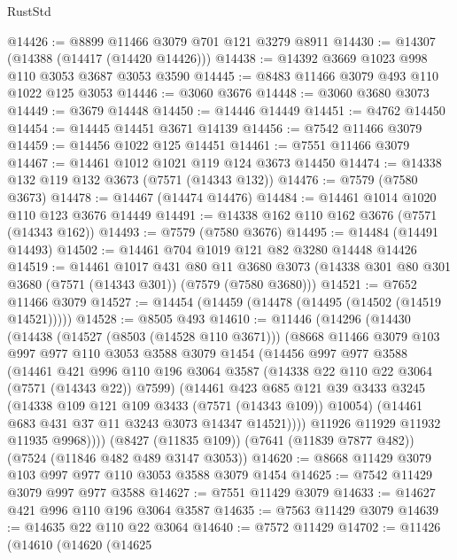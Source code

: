 \begin{lexlean}{RustStd}
\begin{coremodule}
{\begin{coremodule}
{{{{{{{{{{{{{{{{{{{{{{{{{{{{{{{{@14426 := @8899 @11466 @3079 @701 @121 @3279 @8911
@14430 := @14307 (@14388 (@14417 (@14420 @14426)))
@14438 := @14392 @3669 @1023 @998 @110 @3053 @3687 @3053 @3590
@14445 := @8483 @11466 @3079 @493 @110 @1022 @125 @3053
@14446 := @3060 @3676
@14448 := @3060 @3680 @3073
@14449 := @3679 @14448
@14450 := @14446 @14449
@14451 := @4762 @14450
@14454 := @14445 @14451 @3671 @14139
@14456 := @7542 @11466 @3079
@14459 := @14456 @1022 @125 @14451
@14461 := @7551 @11466 @3079
@14467 := @14461 @1012 @1021 @119 @124 @3673 @14450
@14474 := @14338 @132 @119 @132 @3673 (@7571 (@14343 @132))
@14476 := @7579 (@7580 @3673)
@14478 := @14467 (@14474 @14476)
@14484 := @14461 @1014 @1020 @110 @123 @3676 @14449
@14491 := @14338 @162 @110 @162 @3676 (@7571 (@14343 @162))
@14493 := @7579 (@7580 @3676)
@14495 := @14484 (@14491 @14493)
@14502 := @14461 @704 @1019 @121 @82 @3280 @14448 @14426
@14519 := @14461
    @1017
    @431
    @80
    @11
    @3680
    @3073
    (@14338 @301 @80 @301 @3680 (@7571 (@14343 @301)) (@7579 (@7580 @3680)))
@14521 := @7652 @11466 @3079
@14527 := @14454 (@14459 (@14478 (@14495 (@14502 (@14519 @14521)))))
@14528 := @8505 @493
@14610 := @11446
    (@14296
      (@14430
        (@14438
          (@14527 (@8503 (@14528 @110 @3671)))
          (@8668
            @11466
            @3079
            @103
            @997
            @977
            @110
            @3053
            @3588
            @3079
            @1454
            (@14456
              @997
              @977
              @3588
              (@14461
                @421
                @996
                @110
                @196
                @3064
                @3587
                (@14338 @22 @110 @22 @3064 (@7571 (@14343 @22)) @7599)
                (@14461
                  @423
                  @685
                  @121
                  @39
                  @3433
                  @3245
                  (@14338 @109 @121 @109 @3433 (@7571 (@14343 @109)) @10054)
                  (@14461 @683 @431 @37 @11 @3243 @3073 @14347 @14521))))
            @11926
            @11929
            @11932
            @11935
            @9968))))
    (@8427 (@11835 @109))
    (@7641 (@11839 @7877 @482))
    (@7524 (@11846 @482 @489 @3147 @3053))
@14620 := @8668 @11429 @3079 @103 @997 @977 @110 @3053 @3588 @3079 @1454
@14625 := @7542 @11429 @3079 @997 @977 @3588
@14627 := @7551 @11429 @3079
@14633 := @14627 @421 @996 @110 @196 @3064 @3587
@14635 := @7563 @11429 @3079
@14639 := @14635 @22 @110 @22 @3064
@14640 := @7572 @11429
@14702 := @11426
    (@14610
      (@14620
        (@14625
}}}}}}}}}}}}}}}}}}}}}}}}}}}}}}}}
\end{coremodule}}
\end{coremodule}
\end{lexlean}
